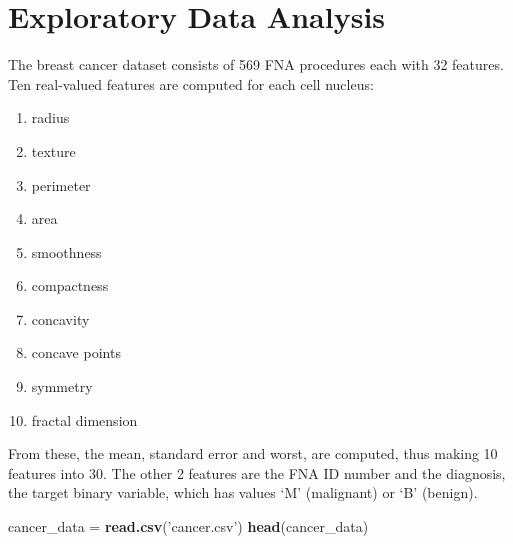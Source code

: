 \documentclass[
]{article}
\newenvironment{Shaded}{\begin{snugshade}}{\end{snugshade}}
\newcommand{\KeywordTok}[1]{\textcolor[rgb]{0.13,0.29,0.53}{\textbf{#1}}}
\newcommand{\NormalTok}[1]{#1}
\newcommand{\StringTok}[1]{\textcolor[rgb]{0.31,0.60,0.02}{#1}}
\providecommand{\tightlist}{%
  \setlength{\itemsep}{0pt}\setlength{\parskip}{0pt}}
\begin{document}
\hypertarget{exploratory-data-analysis}{%
\section{Exploratory Data Analysis}\label{exploratory-data-analysis}}

The breast cancer dataset consists of 569 FNA procedures each with 32
features. Ten real-valued features are computed for each cell nucleus:

\begin{enumerate}
\def\labelenumi{\alph{enumi})}
\tightlist
\item
  radius
\item
  texture
\item
  perimeter
\item
  area
\item
  smoothness
\item
  compactness
\item
  concavity
\item
  concave points
\item
  symmetry
\item
  fractal dimension
\end{enumerate}

From these, the mean, standard error and worst, are computed, thus
making 10 features into 30. The other 2 features are the FNA ID number
and the diagnosis, the target binary variable, which has values `M'
(malignant) or `B' (benign).

\begin{Shaded}
\begin{Highlighting}[]
\NormalTok{cancer_data =}\StringTok{ }\KeywordTok{read.csv}\NormalTok{(}\StringTok{'cancer.csv'}\NormalTok{)}
\KeywordTok{head}\NormalTok{(cancer_data)}
\end{Highlighting}
\end{Shaded}
\end{document}
